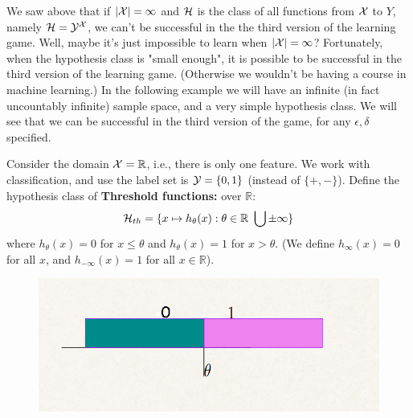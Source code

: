 

We saw above that if $|\mathcal{X}|=\infty$ and $\mathcal{H}$ is the class of all functions from
$\mathcal{X}$ to $Y$, namely $\mathcal{H}=\mathcal{Y}^{\mathcal{X}}$, we can't be successful in the  the third version of the learning game. 
Well, maybe it's just impossible to learn when $|\mathcal{X}|=\infty$?  Fortunately, when the hypothesis class is "small enough", it is possible to be successful in the third version of the learning game. (Otherwise we wouldn't be having a course in machine learning.) In the following example we will have an infinite (in fact uncountably infinite) sample space, and a very simple hypothesis class. We will see that we can be successful in the third version of the game, for any $\epsilon,\delta$ specified. 

Consider the domain $\mathcal{X}=\mathbb{R}$, i.e., there is only one feature. We work with classification, and use the label set is $\mathcal{Y}=\{0,1\}$ (instead of $\{+,-\}$).
Define the hypothesis class of \textbf{Threshold functions:}  over $\mathbb{R}$:
$$\mathcal{H}_{th} = \{ x \mapsto h_{\theta}(x) : \theta \in \mathbb{R}\ \bigcup \pm\infty\}$$
where $ h_{\theta}(x)=0$ for $x\leq \theta$ and $ h_{\theta}(x)=1$ for $x> \theta$. (We define $h_{\infty}(x)=0$ for all $x$, and $h_{-\infty}(x)=1$ for all $x\in\mathbb{R}$).

\begin{figure}[h!]
  \centering
    \includegraphics[scale=0.3]{threshold.png}
\end{figure}
\vspace{5mm}

